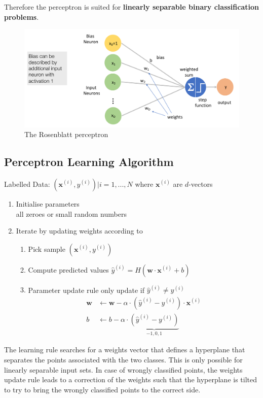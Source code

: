 \documentclass[11pt]{article}
\begin{document}
Therefore the perceptron is suited for \textbf{linearly separable binary classification problems}.

\begin{figure}[hbt]
	\centering
	\includegraphics[width=0.6\linewidth, keepaspectratio]{img/rosenblatt_perceptron}
	\caption{The Rosenblatt perceptron}
	\label{fig:rosenblattperceptron}
\end{figure}

\subsection{Perceptron Learning Algorithm}
Labelled Data: \qquad ${(\textbf{x}^{(i)},y^{(i)})|i=1,...,N}$ where $\textbf{x}^{(i)}$ are $d$-vectors
\begin{enumerate}
	\item Initialise parameters\\
	all zeroes or small random numbers
	\item Iterate by updating weights according to
		\begin{enumerate}[label=\Alph*.]
			\item Pick sample \qquad\qquad\qquad\qquad$\left( \textbf{x}^{(i)},y^{(i)} \right)$
			\item Compute predicted values \qquad $\hat{y}^{(i)} = H(\textbf{w}\cdot\textbf{x}^{(i)} + b)$
			\item Parameter update rule \quad\quad\quad only update if $\hat{y}^{(i)} \ne y^{(i)}$\\
			\begin{align*}
				\textbf{w} &\leftarrow \textbf{w} - \alpha \cdot \left(\hat{y}^{(i)} - y^{(i)}\right) \cdot \textbf{x}^{(i)}\\
				b &\leftarrow b - \alpha \cdot \underbrace{\left(\hat{y}^{(i)} - y^{(i)}\right)}_{{-1,0,1}}
			\end{align*}
		\end{enumerate}
\end{enumerate}

The learning rule searches for a weights vector that defines a hyperplane that separates the points associated with the two classes. This is only possible for linearly separable input sets. In case of wrongly classified points, the weights update rule leads to a correction of the weights such that the hyperplane is tilted to try to bring the wrongly classified points to the correct side.
\end{document}
